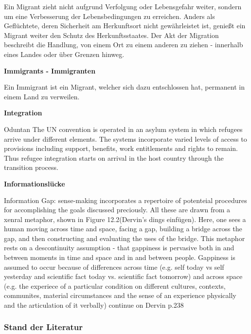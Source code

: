 Ein Migrant zieht nicht aufgrund Verfolgung oder Lebensgefahr weiter, sondern um eine Verbesserung der Lebensbedingungen zu erreichen. Anders als Geflüchtete, deren Sicherheit am Herkunftsort nicht gewährleistet ist, genießt ein Migrant weiter den Schutz des Herkunftsstaates.
Der Akt der Migration beschreibt die Handlung, von einem Ort zu einem anderen zu ziehen - innerhalb eines Landes oder über Grenzen hinweg.

\textbf{Immigrants - Immigranten}

Ein Immigrant ist ein Migrant, welcher sich dazu entschlossen hat, permanent in einem Land zu verweilen.

\textbf{Integration}


Oduntan
The UN convention is operated in an asylum system in
which refugees arrive under different elements. The
systems incorporate varied levels of access to provisions
including support, benefits, work entitlements and rights to
remain. Thus refugee integration starts on arrival in the host
country through the transition process.


\textbf{Informationslücke}

Information Gap:
\cite{dervin2003sense}sense-making incorporates a repertoire of potenteial procedures for accomplishing the goals discussed preciously. All these are drawn from a xenral metaphor, shown in Figure 12.2(Dervin's dings einfügen). Here, one sees a human moving across time and space, facing a gap, building a bridge across the gap, and then constructing and evaluating the uses of the bridge. This metaphor rests on a descontinuity assumption - that gappiness is pervasive both in and between moments in time and space and in and between people. Gappiness is assumed to occur because of differences across time (e.g. self today vs self yesterday and scientific fact today vs. scientific fact tomorrow) and across space (e.g. the experiece of a particular condition on different cultures, contexts, communites, material circumstances and the sense of an experience physically and the articulation of it verbally)
continue on Dervin p.238


\subsubsection{Stand der Literatur}

